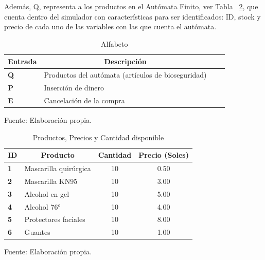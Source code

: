 \documentclass[10pt,conference]{IEEEtran}
\begin{document}
Además, Q, representa a los productos en el Autómata Finito, ver Tabla  ~\ref{tab2}, que cuenta dentro del simulador con características para ser identificados: ID, stock y precio de cada uno de las variables con las que cuenta el autómata.

\begin{table}[H]
\centering
\caption{Alfabeto}
\label{tab3}
\begingroup
    \setlength{\tabcolsep}{ 6pt} %
    \renewcommand{\arraystretch}{1.6} %
\begin{tabular}{|l|l|c|c|}
\hline
\multicolumn{1}{|c|}{\textbf{Entrada}} & \multicolumn{1}{c|}{\textbf{Descripción}} \\ \hline
\textbf{Q}                      & Productos del autómata (artículos de bioseguridad)                   \\ \hline
\textbf{P}                        &Inserción de dinero \\ \hline
\textbf{E}                        &Cancelación de la compra \\ \hline

\end{tabular}
\endgroup
\end{table}
\centering 
\vspace{-3mm}
{Fuente: Elaboración propia.}
\vspace{2mm}


\begin{table}[H]
\centering
\caption{Productos, Precios y Cantidad disponible}
\label{tab2}
\begingroup
    \setlength{\tabcolsep}{ 6pt} %
    \renewcommand{\arraystretch}{1.6} %
\begin{tabular}{|l|l|c|c|}
\hline
\multicolumn{1}{|c|}{\textbf{ID}} & \multicolumn{1}{c|}{\textbf{Producto}} & \textbf{Cantidad} & \textbf{Precio (Soles)} \\ \hline
\textbf{1}                        & Mascarilla quirúrgica                  & 10                & 0.50                    \\ \hline
\textbf{2}                        & Mascarilla KN95                        & 10                & 3.00                    \\ \hline
\textbf{3}                        & Alcohol en gel                         & 10                & 5.00                    \\ \hline
\textbf{4}                        & Alcohol 76°                            & 10                & 4.00                    \\ \hline
\textbf{5}                        & Protectores faciales                   & 10                & 8.00                    \\ \hline
\textbf{6}                        & Guantes                                & 10                & 1.00                    \\ \hline

\end{tabular}
\endgroup
\end{table}
\centering 
\vspace{-3mm}
{Fuente: Elaboración propia.}
\vspace{2mm}
\justify 
\end{document}

